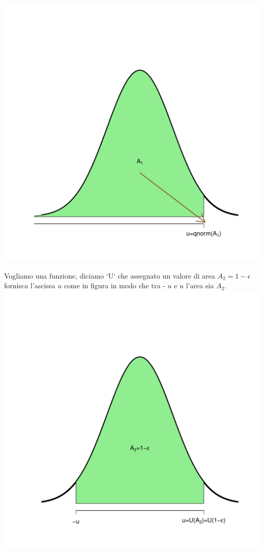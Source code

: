 \documentclass[onecolumn,12pt]{book}\usepackage[]{graphicx}\usepackage[]{color}
\makeatletter
\def\maxwidth{ %
  \ifdim\Gin@nat@width>\linewidth
    \linewidth
  \else
    \Gin@nat@width
  \fi
}
\newenvironment{knitrout}{}{} %
\makeatother
\begin{document}
\begin{knitrout}
\color{fgcolor}
\includegraphics[width=\maxwidth]{figure/unnamed-chunk-35-1} 

\end{knitrout}

Vogliamo una funzione, diciamo `U` che assegnato un valore di  area $A_2 = 1 - \epsilon$   fornisca l'ascissa $u$ come in figura in modo che tra - $u$ e $u$ l'area sia $A_2$.  
\begin{knitrout}
\color{fgcolor}
\includegraphics[width=\maxwidth]{figure/unnamed-chunk-36-1} 

\end{knitrout}
\end{document}

